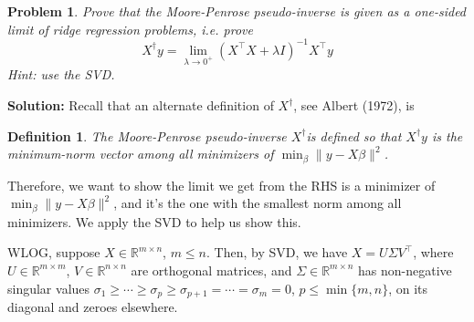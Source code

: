 \documentclass[11pt]{article}
\theoremstyle{plain} %
\newtheorem{definition}[theorem]{Definition}
\newtheorem{problem}[theorem]{Problem}
\newenvironment{solution}
{\color{C2}\normalfont\begin{framed}\begingroup\textbf{Solution:} }
  {\endgroup\end{framed}}
\theoremstyle{remark}
\begin{document}
\begin{problem}
    Prove that the Moore-Penrose pseudo-inverse is given as a one-sided limit of ridge regression problems, i.e. prove
$$
X^\dagger y=\lim _{\lambda \rightarrow 0^{+}}\left(X^\top X+\lambda I\right)^{-1} X^\top y
$$
Hint: use the SVD.
\end{problem}
\begin{solution}
    Recall that an alternate definition of $X^\dagger$, see \cite{albert1972} Albert (1972), is 
    {\color{C6}\begin{framed}{
        \begin{definition}
    The Moore-Penrose pseudo-inverse $X^\dagger$is defined so that $X^\dagger y$ is the minimum-norm vector among all minimizers of $\min_{\beta}\|y-X \beta\|^2$.
    \end{definition}}\end{framed}}

    Therefore, we want to show the limit we get from the RHS is a minimizer of $\min_{\beta}\|y-X \beta\|^2$, and it's the one with the smallest norm among all minimizers. We apply the SVD to help us show this. 

    WLOG, suppose $X\in \mathbb{R}^{m\times n}$, $m\le n$. Then, by SVD, we have $X = U\Sigma V^\top$, where $U\in \mathbb{R}^{m\times m}$, $V\in \mathbb{R}^{n\times n}$ are orthogonal matrices, and $\Sigma \in \mathbb{R}^{m\times n}$ has non-negative singular values $\sigma_1\ge \cdots \ge \sigma_p \ge \sigma_{p+1} = \cdots = \sigma_m = 0$, $p\le \min\{m, n\}$, on its diagonal and zeroes elsewhere.


\end{solution}
\end{document}
